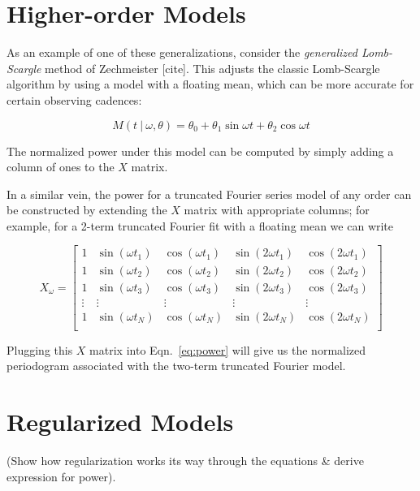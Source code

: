 \documentclass[12pt,preprint]{aastex}
\begin{document}
\section{Higher-order Models}

As an example of one of these generalizations, consider the {\it generalized Lomb-Scargle} method of Zechmeister [cite]. This adjusts the classic Lomb-Scargle algorithm by using a model with a floating mean, which can be more accurate for certain observing cadences:

\begin{equation}
  M(t~|~\omega, \theta) = \theta_0 + \theta_1\sin\omega t + \theta_2\cos\omega t
\end{equation}

The normalized power under this model can be computed by simply adding a column of ones to the $X$ matrix.

In a similar vein, the power for a truncated Fourier series model of any order can be constructed by extending the $X$ matrix with appropriate columns; for example, for a 2-term truncated Fourier fit with a floating mean we can write

\begin{equation}
X_\omega = \left[
\begin{array}{ccccc}
1 & \sin(\omega t_1) & \cos(\omega t_1) & \sin(2\omega t_1) & \cos(2\omega t_1)\\
1 & \sin(\omega t_2) & \cos(\omega t_2) & \sin(2\omega t_2) & \cos(2\omega t_2)\\
1 & \sin(\omega t_3) & \cos(\omega t_3) & \sin(2\omega t_3) & \cos(2\omega t_3)\\
\vdots & \vdots & \vdots & \vdots & \vdots \\
1 & \sin(\omega t_N) & \cos(\omega t_N) & \sin(2\omega t_N) & \cos(2\omega t_N)\\
\end{array}
\right]
\end{equation}

Plugging this $X$ matrix into Eqn.~\ref{eq:power} will give us the normalized periodogram associated with the two-term truncated Fourier model.

\section{Regularized Models}

(Show how regularization works its way through the equations \& derive expression for power).
\end{document}
